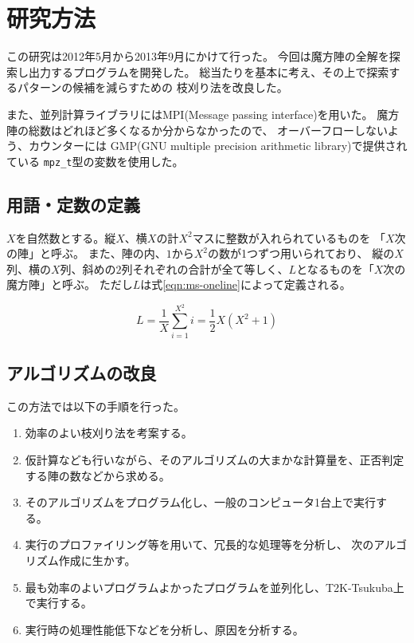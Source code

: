 \section{研究方法}
この研究は2012年5月から2013年9月にかけて行った。
今回は魔方陣の全解を探索し出力するプログラムを開発した。
総当たりを基本に考え、その上で探索するパターンの候補を減らすための
枝刈り法を改良した。

また、並列計算ライブラリにはMPI(Message passing interface)を用いた。
魔方陣の総数はどれほど多くなるか分からなかったので、
オーバーフローしないよう、カウンターには
GMP(GNU multiple precision arithmetic library)で提供されている
{\tt mpz\_t}型の変数を使用した。

\subsection{用語・定数の定義}
$X$を自然数とする。縦$X$、横$X$の計$X^2$マスに整数が入れられているものを
「$X$次の陣」と呼ぶ。
また、陣の内、$1$から$X^2$の数が1つずつ用いられており、
縦の$X$列、横の$X$列、斜めの$2$列それぞれの合計が全て等しく、$L$となるものを「$X$次の魔方陣」と呼ぶ。
ただし$L$は式\ref{eqn:ms-oneline}によって定義される。

\begin{equation} \label{eqn:ms-oneline}
L=\frac{1}{X} \sum_{i=1}^{X^2}i = \frac{1}{2} X(X^2+1)
\end{equation}


\subsection{アルゴリズムの改良}
この方法では以下の手順を行った。
\begin{enumerate}
	\item 効率のよい枝刈り法を考案する。
	\item 仮計算なども行いながら、そのアルゴリズムの大まかな計算量を、正否判定する陣の数などから求める。
	\item そのアルゴリズムをプログラム化し、一般のコンピュータ1台上で実行する。
	\item 実行のプロファイリング等を用いて、冗長的な処理等を分析し、
	 	次のアルゴリズム作成に生かす。
	\item 最も効率のよいプログラムよかったプログラムを並列化し、T2K-Tsukuba上で実行する。
	\item 実行時の処理性能低下などを分析し、原因を分析する。
\end{enumerate}


